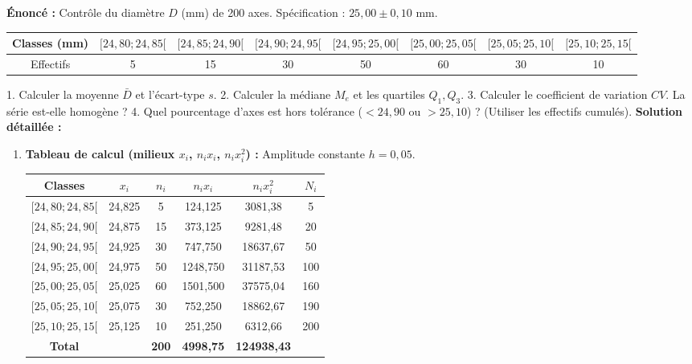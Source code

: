 \documentclass[11pt]{article}
\begin{document}
\begin{exoresolu}
    \textbf{Énoncé :} Contrôle du diamètre $D$ (mm) de 200 axes. Spécification : $25,00 \pm 0,10$ mm.
    \begin{center}
    \begin{tabular}{|c|c|c|c|c|c|c|c|}\hline
    \rowcolor{popblueL} Classes (mm) & $[24,80;24,85[$ & $[24,85;24,90[$ & $[24,90;24,95[$ & $[24,95;25,00[$ & $[25,00;25,05[$ & $[25,05;25,10[$ & $[25,10;25,15[$ \\ \hline
    Effectifs & 5 & 15 & 30 & 50 & 60 & 30 & 10 \\ \hline
    \end{tabular}
    \end{center}
    1. Calculer la moyenne $\bar{D}$ et l'écart-type $s$.
    2. Calculer la médiane $M_e$ et les quartiles $Q_1, Q_3$.
    3. Calculer le coefficient de variation $CV$. La série est-elle homogène ?
    4. Quel pourcentage d'axes est hors tolérance ($<24,90$ ou $>25,10$) ? (Utiliser les effectifs cumulés).
    \tcblower
    \textbf{Solution détaillée :}
    \begin{enumerate}
        \item \textbf{Tableau de calcul (milieux $x_i$, $n_i x_i$, $n_i x_i^2$) :} Amplitude constante $h=0,05$.
        \begin{center}
        \begin{tabular}{|c|c|c|c|c|c|}\hline
        \rowcolor{popblueL} Classes & $x_i$ & $n_i$ & $n_i x_i$ & $n_i x_i^2$ & $N_i$ \\ \hline
        $[24,80;24,85[$ & 24,825 & 5 & 124,125 & 3081,38 & 5 \\ \hline
        $[24,85;24,90[$ & 24,875 & 15 & 373,125 & 9281,48 & 20 \\ \hline
        $[24,90;24,95[$ & 24,925 & 30 & 747,750 & 18637,67 & 50 \\ \hline
        $[24,95;25,00[$ & 24,975 & 50 & 1248,750 & 31187,53 & 100 \\ \hline
        $[25,00;25,05[$ & 25,025 & 60 & 1501,500 & 37575,04 & 160 \\ \hline
        $[25,05;25,10[$ & 25,075 & 30 & 752,250 & 18862,67 & 190 \\ \hline
        $[25,10;25,15[$ & 25,125 & 10 & 251,250 & 6312,66 & 200 \\ \hline \hline
        \textbf{Total} & & \textbf{200} & \textbf{4998,75} & \textbf{124938,43} & \\ \hline
        \end{tabular}

\end{center}
\end{enumerate}
\end{exoresolu}
\end{document}
